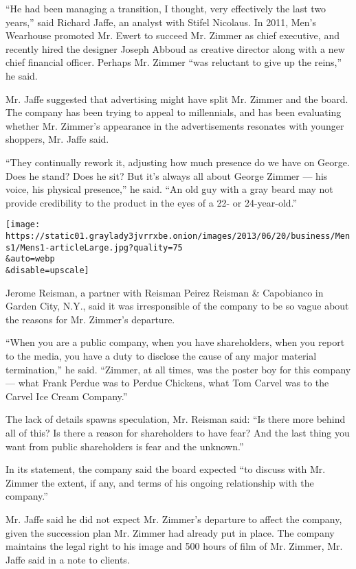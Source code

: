 ``He had been managing a transition, I thought, very effectively the
last two years,'' said Richard Jaffe, an analyst with Stifel Nicolaus.
In 2011, Men's Wearhouse promoted Mr. Ewert to succeed Mr. Zimmer as
chief executive, and recently hired the designer Joseph Abboud as
creative director along with a new chief financial officer. Perhaps Mr.
Zimmer ``was reluctant to give up the reins,'' he said.

Mr. Jaffe suggested that advertising might have split Mr. Zimmer and the
board. The company has been trying to appeal to millennials, and has
been evaluating whether Mr. Zimmer's appearance in the advertisements
resonates with younger shoppers, Mr. Jaffe said.

``They continually rework it, adjusting how much presence do we have on
George. Does he stand? Does he sit? But it's always all about George
Zimmer --- his voice, his physical presence,'' he said. ``An old guy
with a gray beard may not provide credibility to the product in the eyes
of a 22- or 24-year-old.''

\texttt{[image: https://static01.graylady3jvrrxbe.onion/images/2013/06/20/business/Mens1/Mens1-articleLarge.jpg?quality=75\\\&auto=webp\\\&disable=upscale]}

Jerome Reisman, a partner with Reisman Peirez Reisman \& Capobianco in
Garden City, N.Y., said it was irresponsible of the company to be so
vague about the reasons for Mr. Zimmer's departure.

``When you are a public company, when you have shareholders, when you
report to the media, you have a duty to disclose the cause of any major
material termination,'' he said. ``Zimmer, at all times, was the poster
boy for this company --- what Frank Perdue was to Perdue Chickens, what
Tom Carvel was to the Carvel Ice Cream Company.''

The lack of details spawns speculation, Mr. Reisman said: ``Is there
more behind all of this? Is there a reason for shareholders to have
fear? And the last thing you want from public shareholders is fear and
the unknown.''

In its statement, the company said the board expected ``to discuss with
Mr. Zimmer the extent, if any, and terms of his ongoing relationship
with the company.''

Mr. Jaffe said he did not expect Mr. Zimmer's departure to affect the
company, given the succession plan Mr. Zimmer had already put in place.
The company maintains the legal right to his image and 500 hours of film
of Mr. Zimmer, Mr. Jaffe said in a note to clients.

